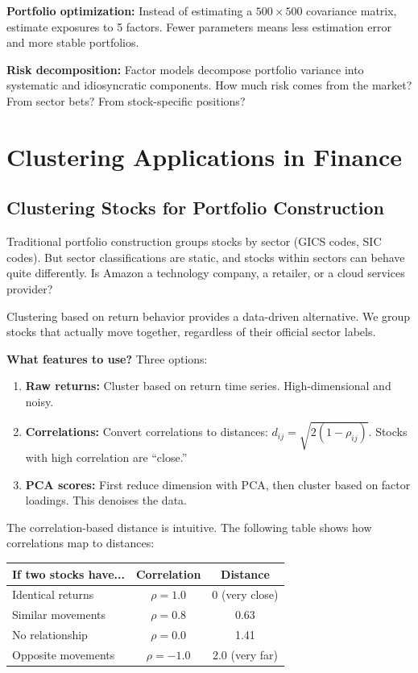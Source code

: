 \documentclass[11pt,a4paper]{article}
\begin{document}
\textbf{Portfolio optimization:} Instead of estimating a $500 \times 500$ covariance matrix, estimate exposures to 5 factors. Fewer parameters means less estimation error and more stable portfolios.

\textbf{Risk decomposition:} Factor models decompose portfolio variance into systematic and idiosyncratic components. How much risk comes from the market? From sector bets? From stock-specific positions?

\section{Clustering Applications in Finance}

\subsection{Clustering Stocks for Portfolio Construction}

Traditional portfolio construction groups stocks by sector (GICS codes, SIC codes). But sector classifications are static, and stocks within sectors can behave quite differently. Is Amazon a technology company, a retailer, or a cloud services provider?

Clustering based on return behavior provides a data-driven alternative. We group stocks that actually move together, regardless of their official sector labels.

\textbf{What features to use?} Three options:

\begin{enumerate}
    \item \textbf{Raw returns:} Cluster based on return time series. High-dimensional and noisy.
    \item \textbf{Correlations:} Convert correlations to distances: $d_{ij} = \sqrt{2(1 - \rho_{ij})}$. Stocks with high correlation are ``close.''
    \item \textbf{PCA scores:} First reduce dimension with PCA, then cluster based on factor loadings. This denoises the data.
\end{enumerate}

The correlation-based distance is intuitive. The following table shows how correlations map to distances:

\begin{center}
\begin{tabular}{lcc}
\toprule
\textbf{If two stocks have...} & \textbf{Correlation} & \textbf{Distance} \\
\midrule
Identical returns & $\rho = 1.0$ & 0 (very close) \\
Similar movements & $\rho = 0.8$ & 0.63 \\
No relationship & $\rho = 0.0$ & 1.41 \\
Opposite movements & $\rho = -1.0$ & 2.0 (very far) \\
\bottomrule
\end{tabular}
\end{center}
\end{document}
